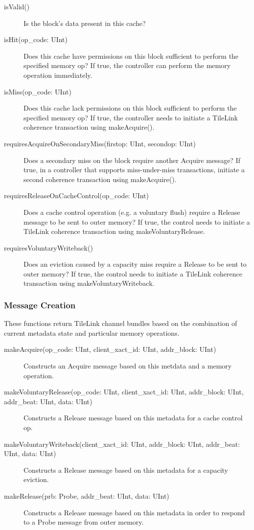 \begin{description}
\item[isValid()]
Is the block's data present in this cache?
\item[isHit(op\_code: UInt)]
Does this cache have permissions on this block sufficient to perform the specified memory op?
If true, the controller can perform the memory operation immediately.
\item[isMiss(op\_code: UInt)]
Does this cache lack permissions on this block sufficient to perform the specified memory op?
If true, the controller needs to initiate a TileLink coherence transaction using makeAcquire().
\item[requiresAcquireOnSecondaryMiss(firstop: UInt, secondop: UInt)]
Does a secondary miss on the block require another Acquire message?
If true, in a controller that supports miss-under-miss transactions, initiate a second coherence transaction using makeAcquire().
\item[requiresReleaseOnCacheControl(op\_code: UInt)]
Does a cache control operation (e.g. a voluntary flush) require a Release message to be sent to outer memory?
If true, the control needs to initiate a TileLink coherence transaction using makeVoluntaryRelease.
\item[requiresVoluntaryWriteback()]
Does an eviction caused by a capacity miss require a Release to be sent to outer memory?
If true, the control needs to initiate a TileLink coherence transaction using makeVoluntaryWriteback.
\end{description}


\subsubsection{Message Creation}

These functions return TileLink channel bundles based on the combination of current metadata state and particular memory operations.

\begin{description}
\item[makeAcquire(op\_code: UInt, client\_xact\_id: UInt, addr\_block: UInt) ]
Constructs an Acquire message based on this metdata and a memory operation.
\item[makeVoluntaryRelease(op\_code: UInt, client\_xact\_id: UInt, addr\_block: UInt, addr\_beat: UInt, data: UInt) ]
Constructs a Release message based on this metadata for a cache control op.
\item[makeVoluntaryWriteback(client\_xact\_id: UInt, addr\_block: UInt, addr\_beat: UInt, data: UInt) ]
Constructs a Release message based on this metadata for a capacity eviction.
\item[makeRelease(prb: Probe, addr\_beat: UInt, data: UInt) ]
Constructs a Release message based on this metadata in order to respond to a Probe message from outer memory.
\end{description}


